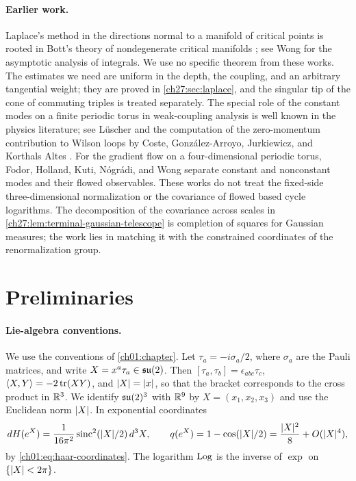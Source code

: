 \paragraph{Earlier work.}
Laplace's method in the directions normal to a manifold of critical points is rooted in Bott's theory of nondegenerate critical manifolds \cite{Bott1954CriticalManifolds}; see Wong \cite{Wong2001AsymptoticIntegrals} for the asymptotic analysis of integrals. We use no specific theorem from these works. The estimates we need are uniform in the depth, the coupling, and an arbitrary tangential weight; they are proved in \cref{ch27:sec:laplace}, and the singular tip of the cone of commuting triples is treated separately. The special role of the constant modes on a finite periodic torus in weak-coupling analysis is well known in the physics literature; see L\"uscher \cite{Luscher1983Torus} and the computation of the zero-momentum contribution to Wilson loops by Coste, Gonz\'alez-Arroyo, Jurkiewicz, and Korthals Altes \cite{CosteEtAl1985ZeroMomentum}. For the gradient flow on a four-dimensional periodic torus, Fodor, Holland, Kuti, N\'ogr\'adi, and Wong \cite{FodorEtAl2012FiniteVolumeFlow} separate constant and nonconstant modes and their flowed observables. These works do not treat the fixed-side three-dimensional normalization or the covariance of flowed based cycle logarithms. The decomposition of the covariance across scales in \cref{ch27:lem:terminal-gaussian-telescope} is completion of squares for Gaussian measures; the work lies in matching it with the constrained coordinates of the renormalization group.

\section{Preliminaries}\label{ch27:sec:preliminaries}

\paragraph{Lie-algebra conventions.}
We use the conventions of \cref{ch01:chapter}. Let $\tau_a=-i\sigma_a/2$, where $\sigma_a$ are the Pauli matrices, and write $X=x^a\tau_a\in\mathfrak{su}(2)$. Then $[\tau_a,\tau_b]=\epsilon_{abc}\tau_c$, $\langle X,Y\rangle=-2\operatorname{tr}(XY)$, and $\lvert X\rvert=\lvert x\rvert$, so that the bracket corresponds to the cross product in $\mathbb R^3$. We identify $\mathfrak{su}(2)^3$ with $\mathbb R^9$ by $X=(x_1,x_2,x_3)$ and use the Euclidean norm $\lvert X\rvert$. In exponential coordinates
\begin{equation*}
 dH(e^X)=\frac1{16\pi^2}\operatorname{sinc}^2(\lvert X\rvert/2)\,d^3X,\qquad q(e^X)=1-\cos(\lvert X\rvert/2)=\frac{\lvert X\rvert^2}8+O(\lvert X\rvert^4),
\end{equation*}
by \eqref{ch01:eq:haar-coordinates}. The logarithm $\operatorname{Log}$ is the inverse of $\exp$ on $\{\lvert X\rvert<2\pi\}$.

